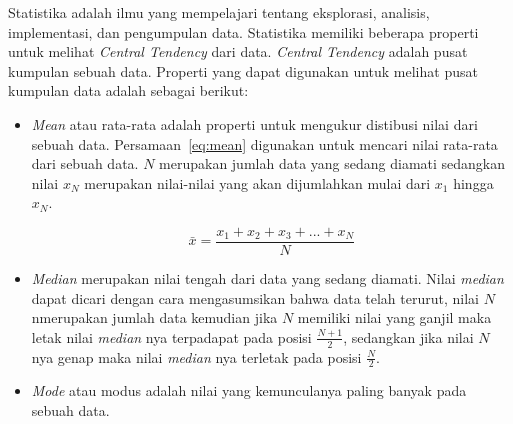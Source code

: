 Statistika adalah ilmu yang mempelajari tentang eksplorasi, analisis, implementasi, dan pengumpulan data. Statistika memiliki beberapa properti untuk melihat \textit{Central Tendency} dari data. \textit{Central Tendency} adalah pusat kumpulan sebuah data. Properti yang dapat digunakan untuk melihat pusat kumpulan data adalah sebagai berikut:
\begin{itemize}
    \item \textit{Mean} atau rata-rata adalah properti untuk mengukur distibusi nilai dari sebuah data. Persamaan~\ref{eq:mean} digunakan untuk mencari nilai rata-rata dari sebuah data. $N$ merupakan jumlah data yang sedang diamati sedangkan nilai $x_N$ merupakan nilai-nilai yang akan dijumlahkan mulai dari $x_1$ hingga $x_N$.

    \begin{equation}
    \label{eq:mean}
        \bar{x} = \frac{x_1+x_2+x_3+...+x_N}{N}
    \end{equation}

     \item \textit{Median} merupakan nilai tengah dari data yang sedang diamati. Nilai \textit{median} dapat dicari dengan cara mengasumsikan bahwa data telah terurut, nilai $N$ nmerupakan jumlah data kemudian jika $N$ memiliki nilai yang ganjil maka letak nilai \textit{median} nya terpadapat pada posisi $\frac{N+1}{2}$, sedangkan jika nilai $N$ nya genap maka nilai \textit{median} nya terletak pada posisi $\frac{N}{2}$.

     \item \textit{Mode} atau modus adalah nilai yang kemunculanya paling banyak pada sebuah data.
\end{itemize}

